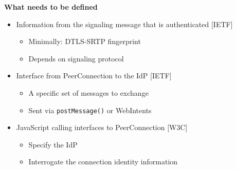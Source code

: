 \documentclass[helvetica]{seminar}
\newcommand{\heading}[1]{%
  \begin{center} 
    \large\bf 
    #1 
  \end{center} 
  \vspace{.4 in}}
\begin{document}
\begin{slide}
\heading{What needs to be defined}

\begin{itemize}
\item Information from the signaling message that is authenticated [IETF]
  \begin{itemize}
  \item Minimally: DTLS-SRTP fingerprint
  \item Depends on signaling protocol
  \end{itemize}

\item Interface from PeerConnection to the IdP [IETF]
  \begin{itemize}
  \item A specific set of messages to exchange
  \item Sent via \verb^postMessage()^ or WebIntents
  \end{itemize}

\item JavaScript calling interfaces to PeerConnection [W3C]
  \begin{itemize}
  \item Specify the IdP
  \item Interrogate the connection identity information
  \end{itemize}
\end{itemize}
\end{slide}
\end{document}
